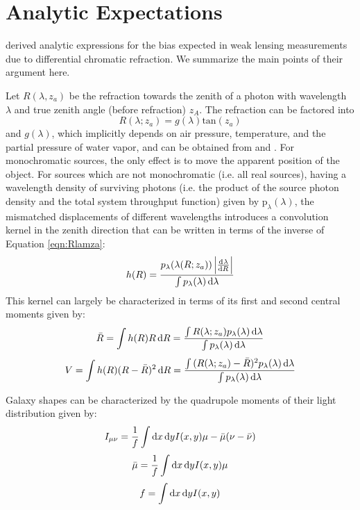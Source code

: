 \documentclass[apj]{emulateapj}
\begin{document}
\section{Analytic Expectations}\label{sec:analytic}
\citet{Plazas2012} derived analytic expressions for the bias expected
in weak lensing measurements due to differential chromatic refraction.
We summarize the main points of their argument here.

Let $R(\lambda, z_a)$ be the refraction towards the zenith of a photon
with wavelength $\lambda$ and true zenith angle (before refraction)
$z_A$.  The refraction can be factored into
\begin{equation}
  R(\lambda; z_a) =  g(\lambda) \mathrm{tan}(z_a)
  \label{eqn:Rlamza}
\end{equation}
and $g(\lambda)$, which implicitly depends on air pressure,
temperature, and the partial pressure of water vapor, and can be
obtained from \citet{Edlen1953} and \citet{Coleman1960}.  For
monochromatic sources, the only effect is to move the apparent
position of the object.  For sources which are not monochromatic
(i.e. all real sources), having a wavelength density of surviving
photons (i.e. the product of the source photon density and the total
system throughput function) given by $\mathrm{p}_{\lambda}(\lambda)$,
the mismatched displacements of different wavelengths introduces a
convolution kernel in the zenith direction that can be written in
terms of the inverse of Equation \ref{eqn:Rlamza}:
\begin{equation}
  h(R) = \frac{p_\lambda(\lambda(R; z_a)) \left|\od{\lambda}{R}\right|}{\int{p_\lambda(\lambda) \dif{\lambda}}}
  \label{eqn:convker}
\end{equation}
This kernel can largely be characterized in terms of its first and
second central moments given by:
\begin{equation}
  \bar{R} = \int{h(R) R \dif{R} } = \frac{\int{R(\lambda; z_a) p_\lambda(\lambda)\dif{\lambda} }}{\int{p_\lambda(\lambda) \dif{\lambda}}}
  \label{eqn:rbar}
\end{equation}
\begin{equation}
  V = \int{h(R) (R - \bar{R})^2 \dif{R} } = \frac{\int{(R(\lambda; z_a) - \bar{R})^2 p_\lambda(\lambda)\dif{\lambda} }}{\int{p_\lambda(\lambda) \dif{\lambda}}}
  \label{eqn:V}
\end{equation}

Galaxy shapes can be characterized by the quadrupole moments of their
light distribution given by:
\begin{equation}
  I_{\mu \nu} = \frac{1}{f}\int{\dif{x} \dif{y} I(x,y)\mu - \bar{\mu}(\nu - \bar{\nu})}
\end{equation}
\begin{equation}
  \bar{\mu} = \frac{1}{f}\int{\dif{x} \dif{y} I(x,y)\mu}
\end{equation}
\begin{equation}
  f = \int{\dif{x} \dif{y} I(x,y)}
\end{equation}
\end{document}
